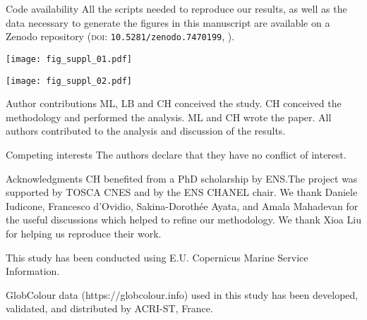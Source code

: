 \begin{articleSubBlock}{Code availability}
    All the scripts needed to reproduce our results, as well as the data necessary to generate the figures in this manuscript are available on a Zenodo repository (\textsc{doi}: \texttt{10.5281/zenodo.7470199}, \cite{haeck_2022_zenodo}).
\end{articleSubBlock}


\begin{figure*}
  \centering
  \texttt{[image: fig\_suppl\_01.pdf]}
  \caption[Sensitivity of the seasonal impact of fronts on HI parameters]{
    Climatological mean of  median values (top row) over weak fronts (blue), strong fronts (green) and background (red), surface fraction occupied by weak fronts and strong fronts (middle row), and global  excess due to weak and strong fronts (bottom row).
    Each line represent a set of parameter with the bolder line indicating the retained set of parameters.
    The tested rolling window sizes are \qty{20}{\km}, \qty{30}{\km}, and \qty{40}{\km}.
    Different normalization coefficients are tested for a \qty{30}{\km} window size: double the variance, double the bimodality, and double the skewness.
  }%
 \label{fig:ts-sensitivity}
\end{figure*}

\begin{figure*}
  \centering
  \texttt{[image: fig\_suppl\_02.pdf]}
  \caption[Seasonal distributions of Chl-\textit{a}]{
    Distribution of  of the year~2007 by seasons~(rows), for the three biomes~(columns), and for the background~(red), weak fronts~(blue) and strong fronts~(green).
    The median value of each distribution is indicated by a vertical line.
  }
  \label{fig:hist-chl}
\end{figure*}

\begin{articleSubBlock}{Author contributions}
  ML, LB and CH conceived the study. CH conceived the methodology and performed the analysis. ML and CH wrote the paper. All authors contributed to the analysis and discussion of the results.
\end{articleSubBlock}

\begin{articleSubBlock}{Competing interests}
  The authors declare that they have no conflict of interest.
\end{articleSubBlock}

\begin{articleSubBlock}{Acknowledgments}
  CH benefited from a PhD scholarship by ENS.\@ The project was supported by TOSCA CNES and by the ENS CHANEL chair.
  We thank Daniele Iudicone, Francesco d'Ovidio, Sakina-Dorothée Ayata, and Amala Mahadevan for the useful discussions which helped to refine our methodology. We thank Xioa Liu for helping us reproduce their work.

  This study has been conducted using E.U. Copernicus Marine Service Information.

  GlobColour data (https://globcolour.info) used in this study has been developed, validated, and distributed by ACRI-ST, France.
\end{articleSubBlock}

